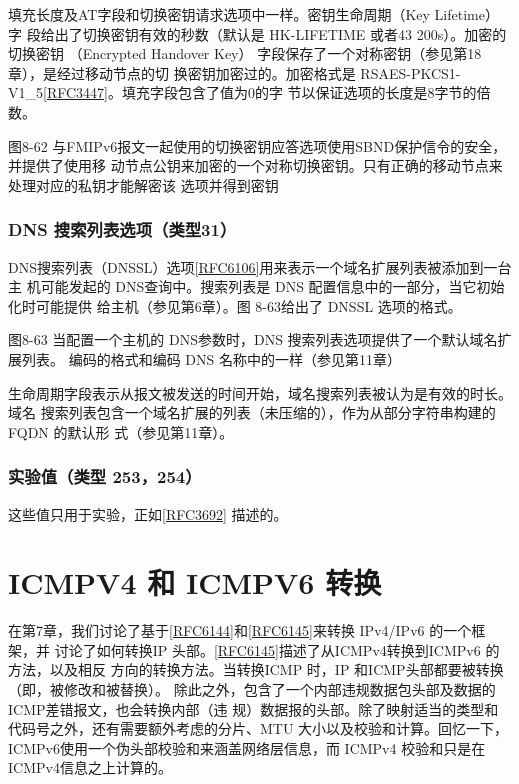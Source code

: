填充长度及AT字段和切换密钥请求选项中一样。密钥生命周期（Key Lifetime）字
段给出了切换密钥有效的秒数（默认是 HK-LIFETIME 或者43 200s）。加密的切换密钥
（Encrypted Handover Key） 字段保存了一个对称密钥（参见第18章），是经过移动节点的切
换密钥加密过的。加密格式是 RSAES-PKCS1-V1\_5\href{https://www.rfc-editor.org/rfc/rfc3447}{[RFC3447]}。填充字段包含了值为0的字
节以保证选项的长度是8字节的倍数。

图8-62 与FMIPv6报文一起使用的切换密钥应答选项使用SBND保护信令的安全，并提供了使用移
动节点公钥来加密的一个对称切换密钥。只有正确的移动节点来处理对应的私钥才能解密该
选项并得到密钥

\subsubsection{DNS 搜索列表选项（类型31）}
DNS搜索列表（DNSSL）选项\href{https://www.rfc-editor.org/rfc/rfc6106}{[RFC6106]}用来表示一个域名扩展列表被添加到一台主
机可能发起的 DNS查询中。搜索列表是 DNS 配置信息中的一部分，当它初始化时可能提供
给主机（参见第6章）。图 8-63给出了 DNSSL 选项的格式。

图8-63 当配置一个主机的 DNS参数时，DNS 搜索列表选项提供了一个默认域名扩展列表。
编码的格式和编码 DNS 名称中的一样（参见第11章）

生命周期字段表示从报文被发送的时间开始，域名搜索列表被认为是有效的时长。域名
搜索列表包含一个域名扩展的列表（未压缩的），作为从部分字符串构建的FQDN 的默认形
式（参见第11章）。

\subsubsection{实验值（类型 253，254）}
这些值只用于实验，正如\href{https://www.rfc-editor.org/rfc/rfc3692}{[RFC3692]} 描述的。

\section{ICMPV4 和 ICMPV6 转换}
在第7章，我们讨论了基于\href{https://www.rfc-editor.org/rfc/rfc6144}{[RFC6144]}和\href{https://www.rfc-editor.org/rfc/rfc6145}{[RFC6145]}来转换 IPv4/IPv6 的一个框架，并
讨论了如何转换IP 头部。\href{https://www.rfc-editor.org/rfc/rfc6145}{[RFC6145]}描述了从ICMPv4转换到ICMPv6 的方法，以及相反
方向的转换方法。当转换ICMP 时，IP 和ICMP头部都要被转换（即，被修改和被替换）。
除此之外，包含了一个内部违规数据包头部及数据的ICMP差错报文，也会转换内部（违
规）数据报的头部。除了映射适当的类型和代码号之外，还有需要额外考虑的分片、MTU
大小以及校验和计算。回忆一下，ICMPv6使用一个伪头部校验和来涵盖网络层信息，而
ICMPv4 校验和只是在ICMPv4信息之上计算的。

